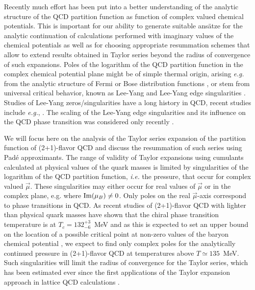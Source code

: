 \documentclass[pdflatex,prd,twocolumn,showpacs,superscriptaddress,nofootinbib]{revtex4-1}
\begin{document}
Recently much effort has been put into a better understanding of the analytic structure of the 
QCD partition function as function of complex valued
chemical potentials. This is important for our 
ability to generate suitable ans\"atze for the 
analytic continuation of calculations performed
with imaginary values of the chemical 
potentials as well as for choosing appropriate
resummation schemes that allow to extend results obtained in Taylor series beyond the radius of convergence of such expansions.
Poles of the logarithm of the QCD partition function in the complex chemical potential plane might be of 
simple thermal origin, arising \textit{e.g.} from the 
analytic structure of Fermi or Bose distribution functions \cite{Skokov:2010uc}, or stem from universal critical behavior, known as Lee-Yang and Lee-Yang edge singularities \cite{Stephanov:2006dn,Pradeep:2019ccv, Basar:2021hdf,Mukherjee:2021tyg}. Studies of Lee-Yang zeros/singularities have a long history in QCD, recent studies include \textit{e.g.}, \cite{Wakayama:2018wkc,Giordano:2019gev,Mondal:2021jxk}. The scaling of the Lee-Yang edge singularities and its influence on the QCD phase transition was considered only recently \cite{Mukherjee:2019eou,Basar:2021hdf,Nicotra:2021ijp,Dimopoulos:2021vrk,Schmidt:2021pey}. 

We will focus here on the analysis of the Taylor series
expansion of the partition function of (2+1)-flavor 
QCD and discuss the resummation of such series using
Pad\'e approximants.
The range of validity of Taylor expansions using 
cumulants calculated at physical values of the quark masses
is limited by singularities of the logarithm of the QCD partition function, {\it i.e.} the pressure, that occur for complex valued $\vec{\mu}$. These singularities may either
occur for real values of  $\vec{\mu}$ or in the
complex plane, e.g. where ${\rm Im}( \mu_B) \ne 0$. Only poles on the real $\vec{\mu}$-axis 
correspond to phase transitions in QCD. As recent studies of (2+1)-flavor QCD with lighter than physical quark masses have shown that the chiral phase transition temperature is 
at $T_c=132^{+3}_{-6}$~MeV \cite{HotQCD:2019xnw} and as this 
is expected to set an upper bound on the location of a possible critical point at non-zero values of the baryon chemical potential \cite{Halasz:1998qr}, we expect to
find only complex poles for the analytically continued pressure in (2+1)-flavor 
QCD at temperatures above $T\simeq 135$~MeV. Such singularities will limit the radius of convergence for the 
Taylor series, which has been estimated ever since the first 
applications of the Taylor expansion approach in lattice QCD calculations \cite{Gavai:2004sd,Allton:2005gk,Giordano:2019gev}. 
\end{document}
